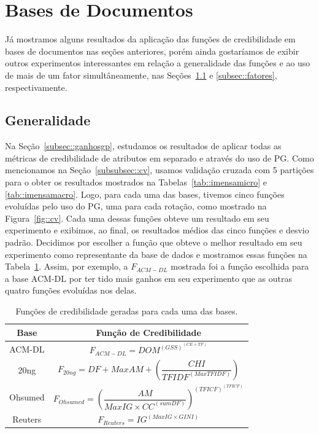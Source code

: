 



\section{Bases de Documentos}
\label{sec::documentos}

Já mostramos alguns resultados da aplicação das funções de credibilidade em bases de documentos nas seções anteriores, porém ainda gostaríamos de exibir outros experimentos interessantes em relação a generalidade das funções e ao uso de mais de um fator simultâneamente, nas Seções~\ref{subsec::generalidade} e \ref{subsec::fatores}, respectivamente.

\subsection{Generalidade}
\label{subsec::generalidade}

Na Seção~\ref{subsec::ganhosgp}, estudamos os resultados de aplicar todas as métricas de credibilidade de atributos em separado e através do uso de \textsc{PG}.
Como mencionamos na Seção~\ref{subsubsec::cv}, usamos validação cruzada com 5 partições para o obter os resultados mostrados na Tabelas~\ref{tab::imensamicro} e \ref{tab::imensamacro}.
Logo, para cada uma das bases, tivemos cinco funções evoluídas pelo uso do \textsc{PG}, uma para cada rotação, como mostrado na Figura~\ref{fig::cv}. 
Cada uma dessas funções obteve um resultado em seu experimento e exibimos, ao final, os resultados médios das cinco funções e desvio padrão.
Decidimos por escolher a função que obteve o melhor resultado em seu experimento como representante da base de dados e mostramos essas funções na Tabela~\ref{tab::representantes}.
Assim, por exemplo, a $F_{ACM-DL}$ mostrada foi a função escolhida para a base \textsc{ACM-DL} por ter tido mais ganhos em seu experimento que as outras quatro funções evoluídas nos delas.

\begin{table}[!h]
\renewcommand{\arraystretch}{1.3}
\centering
\caption{Funções de credibilidade geradas para cada uma das bases.}
\label{tab::representantes}
\begin{scriptsize}
\begin{tabular}{|c||c|}
\toprule
\textbf{Base} & \textbf{Função de Credibilidade}\tabularnewline
\midrule
\hline
ACM-DL   & $F_{ACM-DL} =  DOM^{(GSS)^{(CE + TF)}} $\tabularnewline
\hline 
20ng & $F_{20ng} = DF + MaxAM + (\dfrac{ CHI } { TFIDF^{(MaxTFIDF)} }) $\tabularnewline
\hline 
Ohsumed  & $ F_{Ohsumed} = (\dfrac{AM}{MaxIG \times CC^{(sumDF)}} )^{(TFICF)^{(TFICF)}} $\tabularnewline
\hline 
Reuters & $ F_{Reuters} = IG^{(MaxIG \times GINI)}$\tabularnewline
\bottomrule
\end{tabular}
\end{scriptsize}
\end{table}

